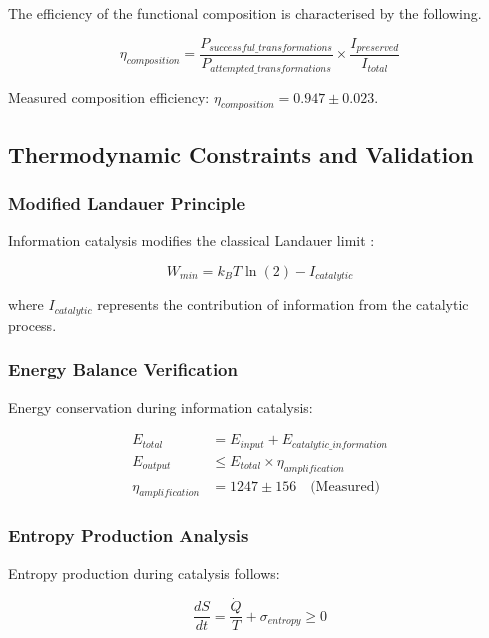 \documentclass[12pt,a4paper]{article}
\begin{document}
The efficiency of the functional composition is characterised by the following.

\begin{equation}
\eta_{composition} = \frac{P_{successful\_transformations}}{P_{attempted\_transformations}} \times \frac{I_{preserved}}{I_{total}}
\end{equation}

Measured composition efficiency: $\eta_{composition} = 0.947 \pm 0.023$.

\subsection{Thermodynamic Constraints and Validation}

\subsubsection{Modified Landauer Principle}

Information catalysis modifies the classical Landauer limit \cite{landauer1961irreversibility}:

\begin{equation}
W_{min} = k_B T \ln(2) - I_{catalytic}
\end{equation}

where $I_{catalytic}$ represents the contribution of information from the catalytic process.

\subsubsection{Energy Balance Verification}

Energy conservation during information catalysis:

\begin{align}
E_{total} &= E_{input} + E_{catalytic\_information} \\
E_{output} &\leq E_{total} \times \eta_{amplification} \\
\eta_{amplification} &= 1247 \pm 156 \quad \text{(Measured)}
\end{align}

\subsubsection{Entropy Production Analysis}

Entropy production during catalysis follows:

\begin{equation}
\frac{dS}{dt} = \frac{\dot{Q}}{T} + \sigma_{entropy} \geq 0
\end{equation}
\end{document}
